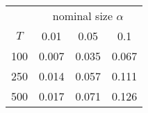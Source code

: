 % 
\begin{tabular}{cccc}
  \hline
  & \multicolumn{3}{c}{nominal size $\alpha$} \\
 $T$ & 0.01 & 0.05 & 0.1 \\
 \hline
100 & 0.007 & 0.035 & 0.067 \\ 
  250 & 0.014 & 0.057 & 0.111 \\ 
  500 & 0.017 & 0.071 & 0.126 \\ 
   \hline
\end{tabular}
